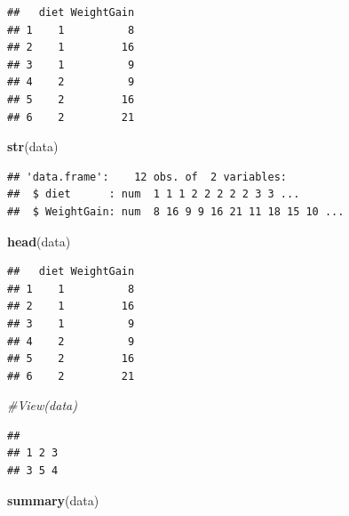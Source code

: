 \documentclass[
]{article}
\newenvironment{Shaded}{\begin{snugshade}}{\end{snugshade}}
\newcommand{\CommentTok}[1]{\textcolor[rgb]{0.56,0.35,0.01}{\textit{#1}}}
\newcommand{\FunctionTok}[1]{\textcolor[rgb]{0.13,0.29,0.53}{\textbf{#1}}}
\newcommand{\NormalTok}[1]{#1}
\newcommand{\SpecialCharTok}[1]{\textcolor[rgb]{0.81,0.36,0.00}{\textbf{#1}}}
\begin{document}
\begin{verbatim}
##   diet WeightGain
## 1    1          8
## 2    1         16
## 3    1          9
## 4    2          9
## 5    2         16
## 6    2         21
\end{verbatim}

\begin{Shaded}
\begin{Highlighting}[]
\FunctionTok{str}\NormalTok{(data)}
\end{Highlighting}
\end{Shaded}

\begin{verbatim}
## 'data.frame':    12 obs. of  2 variables:
##  $ diet      : num  1 1 1 2 2 2 2 2 3 3 ...
##  $ WeightGain: num  8 16 9 9 16 21 11 18 15 10 ...
\end{verbatim}

\begin{Shaded}
\begin{Highlighting}[]
\FunctionTok{head}\NormalTok{(data)}
\end{Highlighting}
\end{Shaded}

\begin{verbatim}
##   diet WeightGain
## 1    1          8
## 2    1         16
## 3    1          9
## 4    2          9
## 5    2         16
## 6    2         21
\end{verbatim}

\begin{Shaded}
\begin{Highlighting}[]
\CommentTok{\#View(data)}
\end{Highlighting}
\end{Shaded}

\begin{Shaded}
\end{Shaded}

\begin{verbatim}
## 
## 1 2 3 
## 3 5 4
\end{verbatim}

\begin{Shaded}
\begin{Highlighting}[]
\FunctionTok{summary}\NormalTok{(data)}
\end{Highlighting}
\end{Shaded}
\end{document}
